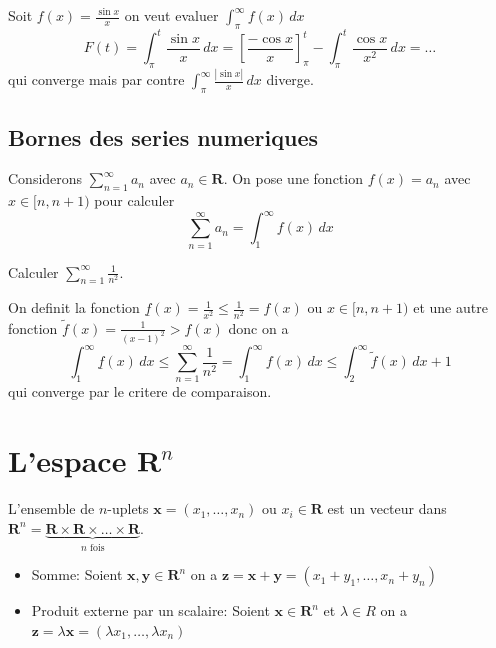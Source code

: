 \begin{example}
Soit $f(x)=\frac{\sin x}{x}$ on veut evaluer $\int_{\pi}^{\infty} f(x) \, dx$
$$
F(t)=\int_{\pi}^{t} \frac{\sin x}{x} \, dx=\left[ \frac{-\cos x}{x}\right]_{\pi}^{t}-\int_{\pi}^{t} \frac{\cos x}{x^{2}} \, dx=\dots 
$$
qui converge mais par contre $\int_{\pi}^{\infty} \frac{|\sin x|}{x} \, dx$ diverge.
\end{example}

\section{Bornes des series numeriques}

Considerons $\sum_{n=1}^{\infty}a_{n}$ avec $a_{n}\in \mathbf{R}$. On pose une fonction $f(x)=a_{n}$ avec $x \in [n,n+1)$ pour calculer
$$
\sum_{n=1}^{\infty} a_{n}=\int_{1}^{\infty} f(x) \, dx 
$$
\begin{example}
Calculer $\sum_{n=1}^{\infty} \frac{1}{n^{2}}$.

On definit la fonction $\underline{f}(x)=\frac{1}{x^{2}}\leq \frac{1}{n^{2}}=f(x)$ ou $x \in[n,n+1)$ et une autre fonction $\tilde{f}(x)=\frac{1}{(x-1)^{2}}>f(x)$ donc on a
$$
\int_{1}^{\infty} \underline{f}(x) \, dx \leq \sum_{n=1}^{\infty}  \frac{1}{n^2} =\int_{1}^{\infty} f(x) \, dx \leq \int_{2}^{\infty} \tilde{f}(x) \, dx+1 
$$
qui converge par le critere de comparaison.
\end{example}

\chapter{L'espace \texorpdfstring{$\mathbf{R}^{n}$}{Rn}}

\begin{definition}[Vecteur]
L'ensemble de $n$-uplets $\boldsymbol{x}=(x_{1},\dots,x_{n})$ ou $x_{i}\in \mathbf{R}$ est un vecteur dans $\mathbf{R}^{n}=\underbrace{ \mathbf{R}\times \mathbf{R}\times\dots \times \mathbf{R} }_{ n\text{ fois} }$.
\end{definition}
\begin{definition}
\begin{itemize}
\item Somme: Soient $\boldsymbol{x},\boldsymbol{y}\in \mathbf{R}^{n}$ on a $\boldsymbol{z}=\boldsymbol{x}+\boldsymbol{y}=(x_{1}+y_{1},\dots,x_{n}+y_{n})$
\item Produit externe par un scalaire: Soient $\boldsymbol{x}\in \mathbf{R}^{n}$ et $\lambda \in R$ on a $\boldsymbol{z}=\lambda \boldsymbol{x}=(\lambda x_{1},\dots,\lambda x_{n})$
\end{itemize}
\end{definition}

